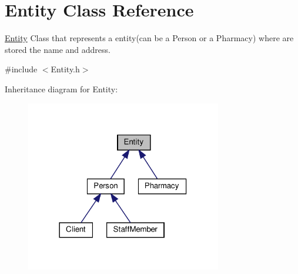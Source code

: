 \hypertarget{classEntity}{}\section{Entity Class Reference}
\label{classEntity}


\hyperlink{classEntity}{Entity} Class that represents a entity(can be a Person or a Pharmacy) where are stored the name and address.  




{\ttfamily \#include $<$Entity.\+h$>$}



Inheritance diagram for Entity\+:
\nopagebreak
\begin{figure}[H]
\begin{center}
\leavevmode
\includegraphics[width=242pt]{classEntity__inherit__graph}
\end{center}
\end{figure}
